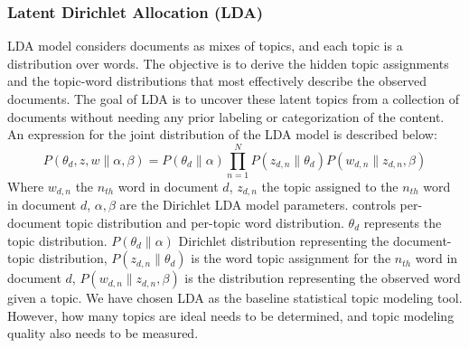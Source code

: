 \documentclass[sn-mathphys,Numbered]{sn-jnl}%
\theoremstyle{thmstyleone}%
\theoremstyle{thmstyletwo}%
\theoremstyle{thmstylethree}%
\begin{document}
\subsubsection{Latent Dirichlet Allocation (LDA)} \label{lda_mdel} 
LDA model \cite{jelodar_latent_2019, gupta_pan_lda_2021, pichardo_lagunas_svd_lda_2015, selvi_classification_2019} considers documents as mixes of topics, and each topic is a distribution over words. The objective is to derive the hidden topic assignments and the topic-word distributions that most effectively describe the observed documents. The goal of LDA is to uncover these latent topics from a collection of documents without needing any prior labeling or categorization of the content. An expression for the joint distribution of the LDA model is described below: \begin{equation} P(\theta_d,z,w\|\alpha,\beta)=P(\theta_d\|\alpha)\prod^N_{n=1}P(z_{d,n}\|\theta_d)P(w_{d,n}\|z_{d,n},\beta) \end{equation} Where $w_{d,n}$ the $n_{th}$ word in document $d$, $z_{d,n}$ the topic assigned to the $n_{th}$ word in document $d$, $\alpha,\beta$ are the Dirichlet LDA model parameters. controls per-document topic distribution and per-topic word distribution. $\theta_d$ represents the topic distribution. $P(\theta_d \| \alpha)$ Dirichlet distribution representing the document-topic distribution, $P(z_{d,n}\|\theta_d)$ is the word topic assignment for the $n_{th}$ word in document $d$, $P(w_{d,n}\|z_{d,n},\beta)$ is the distribution representing the observed word given a topic. We have chosen LDA as the baseline statistical topic modeling tool. However, how many topics are ideal needs to be determined, and topic modeling quality also needs to be measured. 
\end{document}
